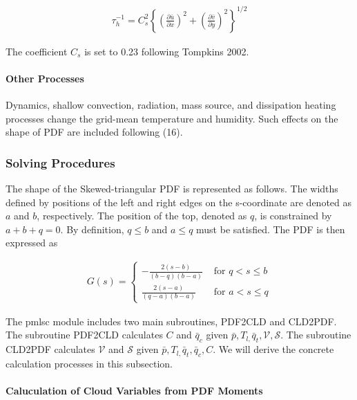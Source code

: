 \begin{eqnarray}
\tau_{h}^{-1}=C_{s}^{2}\left\{\left(\frac{\partial \bar{u}}{\partial x}\right)^{2}+\left(\frac{\partial \bar{v}}{\partial y}\right)^{2}\right\}^{1 / 2}
\end{eqnarray}

The coefficient \(C_{s}\) is set to 0.23 following Tompkins 2002.

\hypertarget{other-processes}{%
\paragraph{Other Processes}\label{other-processes}}

Dynamics, shallow convection, radiation, mass source, and dissipation
heating processes change the grid-mean temperature and humidity. Such
effects on the shape of PDF are included following (16).

\hypertarget{solving-procedures}{%
\subsubsection{Solving Procedures}\label{solving-procedures}}

The shape of the Skewed-triangular PDF is represented as follows. The
widths defined by positions of the left and right edges on the
s-coordinate are denoted as \(a\) and \(b\), respectively. The position
of the top, denoted as \(q\), is constrained by \(a+b+q=0\). By
definition, \(q \leq b\) and \(a \leq q\) must be satisfied. The PDF is
then expressed as

\begin{eqnarray}
G(s)=\left\{\begin{array}{cl}-\frac{2(s-b)}{(b-q)(b-a)} & \text { for } q<s \leq b \\ \frac{2(s-a)}{(q-a)(b-a)} & \text { for } a<s \leq q\end{array}\right.
\end{eqnarray}

The pmlsc module includes two main subroutines, PDF2CLD and CLD2PDF. The
subroutine PDF2CLD calculates \(C\) and \(\bar{q}_{c}\) given
\(\bar{p}, T_{l,} \bar{q}_{t}, \mathcal{V}, \mathcal{S}\). The
subroutine CLD2PDF calculates \(\mathcal{V}\) and \(\mathcal{S}\) given
\(\bar{p}, T_{l,} \bar{q}_{t}, \bar{q}_{c}, C\). We will derive the
concrete calculation processes in this subsection.

\hypertarget{caluculation-of-cloud-variables-from-pdf-moments}{%
\paragraph{Caluculation of Cloud Variables from PDF
Moments}\label{caluculation-of-cloud-variables-from-pdf-moments}}


